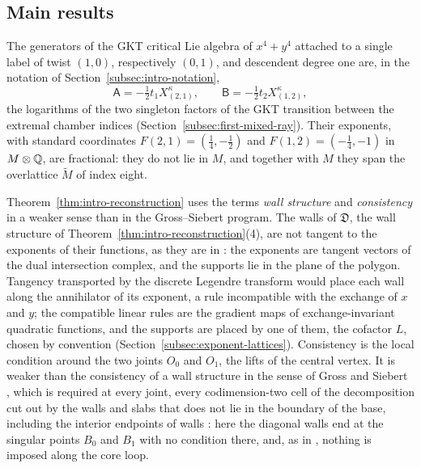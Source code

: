 \subsection{Main results}

The generators of the GKT critical Lie algebra of $x^4+y^4$ attached to a
single label of twist $(1,0)$, respectively $(0,1)$, and descendent degree
one are, in the notation of Section~\ref{subsec:intro-notation},
\[
 \mathsf A=-\tfrac12t_1X^\kappa_{(2,1)},
 \qquad
 \mathsf B=-\tfrac12t_2X^\kappa_{(1,2)},
\]
the logarithms of the two singleton factors of the GKT transition between
the extremal chamber indices (Section~\ref{subsec:first-mixed-ray}).  Their
exponents, with standard coordinates
$F(2,1)=(\frac14,-\frac12)$ and $F(1,2)=(-\frac14,-1)$ in $M\otimes\mathbb Q$,
are fractional: they do not lie in $M$, and together with $M$ they span the
overlattice $\widetilde M$ of index eight.

Theorem~\ref{thm:intro-reconstruction} uses the terms \emph{wall structure}
and \emph{consistency} in a weaker sense than in the Gross--Siebert
program.  The walls of $\mathfrak D$, the wall structure of
Theorem~\ref{thm:intro-reconstruction}(4), are not tangent to the exponents
of their functions, as they are in
\cite{grosspandharipandesiebert2010,grossetal2016theta}: the exponents are tangent
vectors of the dual intersection complex, and the supports lie in the plane
of the polygon.
Tangency transported by the discrete Legendre transform would place each wall
along the annihilator of its exponent, a rule incompatible with the exchange
of $x$ and $y$; the compatible linear rules are the gradient maps of
exchange-invariant quadratic functions, and the supports are placed by one
of them, the cofactor $L$, chosen by convention
(Section~\ref{subsec:exponent-lattices}).  Consistency is the local
condition around the two joints $O_0$ and $O_1$, the lifts of the central
vertex.  It is weaker than the consistency of a wall structure in the sense
of Gross and Siebert \cite{grosssiebert2011}, which is required at every
joint, every codimension-two cell of the decomposition cut out by the walls
and slabs that does not lie in the boundary of the base, including the
interior endpoints of walls
\cite[Defs.~2.27--2.28]{grosssiebert2011}: here the diagonal walls end at
the singular points $B_0$ and $B_1$ with no condition there, and, as in
\cite{grosssiebert2011}, nothing is imposed along the core loop.

